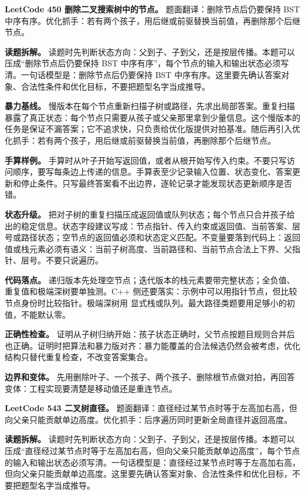 \noindent\textbf{LeetCode 450 删除二叉搜索树中的节点。} 题面翻译：删除节点后仍要保持 BST 中序有序。优化抓手：若有两个孩子，用后继或前驱替换当前值，再删除那个后继节点。

\textbf{读题拆解。} 读题时先判断状态方向：父到子、子到父，还是按层传播。本题可以压成“删除节点后仍要保持 BST 中序有序”，每个节点的输入和输出状态必须写清。一句话模型是：删除节点后仍要保持 BST 中序有序。这里要先确认答案对象、合法性条件和优化目标，不要把题型名字当成推导。

\textbf{暴力基线。} 慢版本在每个节点重新扫描子树或路径，先求出局部答案。重复扫描暴露了真正状态：每个节点只需要从孩子或父亲那里拿到少量信息。这个慢版本的任务是保证不漏答案；它不追求快，只负责给优化版提供对拍基准。随后再引入优化抓手：若有两个孩子，用后继或前驱替换当前值，再删除那个后继节点。

\textbf{手算样例。} 手算时从叶子开始写返回值，或者从根开始写传入约束。不要只写访问顺序，要写每条边上传递的信息。手算表至少记录输入位置、状态变化、答案更新和停止条件。只写最终答案看不出边界，逐轮记录才能发现状态更新顺序是否错。

\textbf{状态升级。} 把对子树的重复扫描压成返回值或队列状态；每个节点只合并孩子给出的稳定信息。状态字段建议写成：节点指针、传入约束或返回值、当前答案、层号或路径状态；空节点的返回值必须和状态定义匹配。不变量要落到代码上：返回值或栈元素必须有语义：当前子树高度、当前路径和、当前节点合法上下界、父指针、层号。不要只说遍历。

\textbf{代码落点。} 递归版本先处理空节点；迭代版本的栈元素要带完整状态；全负值、重复值和极端深树要单独测。C++ 侧还要落实：示例中可以用指针节点，但比较节点身份时比较指针。极端深树用  显式栈或队列。最大路径类题要用足够小的初值，不能默认零。

\textbf{正确性检查。} 证明从子树归纳开始：孩子状态正确时，父节点按题目规则合并后也正确。证明时把算法和暴力版对齐：暴力能覆盖的合法候选仍然会被考虑，优化结构只替代重复检查，不改变答案集合。

\textbf{边界和变体。} 先用删除叶子、一个孩子、两个孩子、删除根节点做对拍，再回答变体：工程实现要清楚是移动值还是重连节点。

\noindent\textbf{LeetCode 543 二叉树直径。} 题面翻译：直径经过某节点时等于左高加右高，但向父亲只能贡献单边高度。优化抓手：后序遍历同时更新全局直径并返回高度。

\textbf{读题拆解。} 读题时先判断状态方向：父到子、子到父，还是按层传播。本题可以压成“直径经过某节点时等于左高加右高，但向父亲只能贡献单边高度”，每个节点的输入和输出状态必须写清。一句话模型是：直径经过某节点时等于左高加右高，但向父亲只能贡献单边高度。这里要先确认答案对象、合法性条件和优化目标，不要把题型名字当成推导。

